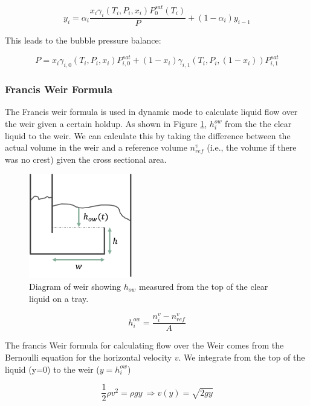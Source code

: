 \begin{equation}
    y_i = \alpha_i\frac{x_i\gamma_i(T_i, P_i, x_i)P_0^{sat}(T_i)}{P} + (1-\alpha_i)y_{i-1}
\end{equation}

This leads to the bubble pressure balance:

\begin{equation}
    P = x_i\gamma_{i,0}(T_i, P_i, x_i)P^{sat}_{i,0} + (1-x_i)\gamma_{i,1}(T_i, P_i, (1-x_i))P^{sat}_{i,1}
\end{equation}

\subsubsection{Francis Weir Formula}

The Francis weir formula is used in dynamic mode to calculate liquid flow over the weir given a certain holdup. As shown in Figure \ref{fig:weir}, $h_i^{ow}$ from the the clear liquid to the weir. We can calculate this by taking the difference between the actual volume in the weir and a reference volume $n^v_{ref}$ (i.e., the volume if there was no crest) given the cross sectional area.

\begin{figure}
    \centering
    \includegraphics[width=0.4\textwidth]{gfx/Chapter06/weir.png}
    \caption{Diagram of weir showing $h_{ow}$ measured from the top of the clear liquid on a tray.}
    \label{fig:weir}
\end{figure}


\begin{equation}
    h^{ow}_i = \frac{n^v_i-n^v_{ref}}{A}
\end{equation}

The francis Weir formula for calculating flow over the Weir comes from the Bernoulli equation for the horizontal velocity $v$. We integrate from the top of the liquid (y=0) to the weir ($y=h_i^{ow}$)

\begin{equation}
    \frac{1}{2} \rho v^2 = \rho g y \ \Longrightarrow v(y) = \sqrt{2gy}
\end{equation}

